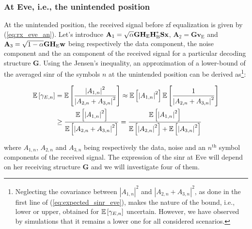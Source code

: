 \subsubsection{At Eve, i.e., the unintended position}
At the unintended position, the received signal before \gls{zf} equalization is given by (\ref{eq:rx_eve_an}). Let's introduce $\textbf{A}_1 = \sqrt{\alpha}  \textbf{G} \textbf{H}_{\text{E}} \textbf{H}_{\text{B}}^* \textbf{S}\textbf{x} $, $\textbf{A}_2 = \textbf{G}  \textbf{v}_\text{E}$ and $\textbf{A}_3 = \sqrt{1-\alpha} \textbf{G} \textbf{H}_{\text{E}} \textbf{w}$ being respectively the data component, the noise component and the \gls{an} component of the received signal for a particular decoding structure $\textbf{G}$. Using the Jensen's inequality, an approximation of a lower-bound of the averaged \gls{sinr} of the symbols $n$ at the unintended position can be derived as\footnote{Neglecting the covariance between $\left|A_{1,n}\right|^2$ and $\left| A_{2,n} + A_{3,n}\right|^2$, as  done in the first line of (\ref{eq:expected_sinr_eve}), makes the nature of the bound, i.e., lower or upper, obtained for $\mathbb{E} \left[\gamma_{E,n}\right]$ uncertain. However, we have observed by simulations that it remains a lower one for all considered scenarios.}:

\begin{equation}
\begin{split}
    \mathbb{E} \left[\gamma_{E,n}\right] &= \mathbb{E} \left[  \frac{ \left| A_{1,n} \right|^2  }{ \left| A_{2,n} + A_{3,n} \right|^2 } \right]  \approx  \mathbb{E} \left[ \left| A_{1,n} \right|^2 \right]  \mathbb{E} \left[ \frac{1}{ \left| A_{2,n} + A_{3,n} \right|^2} \right]  \\
    & \geq \frac{\mathbb{E} \left[   \left| A_{1,n} \right|^2  \right] }{\mathbb{E} \left[ \left| A_{2,n} + A_{3,n} \right|^2  \right]} =  \frac{\mathbb{E} \left[  \left| A_{1,n}\right|^2  \right] }{\mathbb{E} \left[  \left| A_{2,n} \right|^2  \right] +  \mathbb{E} \left[  \left|A_{3,n}\right|^2  \right]}
    \label{eq:expected_sinr_eve}
\end{split}
\end{equation}

where $A_{1,n}$, $A_{2,n}$ and $A_{3,n}$ being respectively the data, noise and \gls{an} $n^{\text{th}}$ symbol components of the received signal. The expression of the \gls{sinr} at Eve will depend on her receiving structure $\textbf{G}$ and we will investigate four of them.

